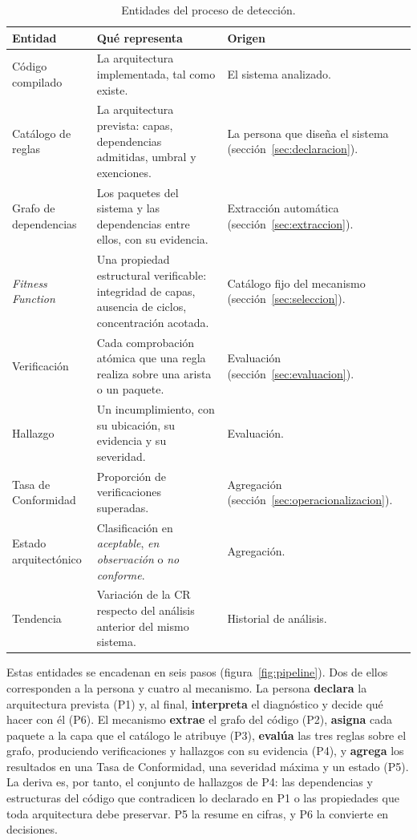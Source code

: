 \begin{table}[H]
\centering
\caption{Entidades del proceso de detección.}
\label{tab:entidades}
\footnotesize
\begin{tabularx}{\textwidth}{>{\raggedright\arraybackslash}p{3.0cm}X>{\raggedright\arraybackslash}p{3.2cm}}
\toprule
\textbf{Entidad} & \textbf{Qué representa} & \textbf{Origen} \\
\midrule
Código compilado & La arquitectura implementada, tal como existe. & El sistema analizado. \\
Catálogo de reglas & La arquitectura prevista: capas, dependencias admitidas, umbral y exenciones. & La persona que diseña el sistema (sección~\ref{sec:declaracion}). \\
Grafo de dependencias & Los paquetes del sistema y las dependencias entre ellos, con su evidencia. & Extracción automática (sección~\ref{sec:extraccion}). \\
\textit{Fitness Function} & Una propiedad estructural verificable: integridad de capas, ausencia de ciclos, concentración acotada. & Catálogo fijo del mecanismo (sección~\ref{sec:seleccion}). \\
Verificación & Cada comprobación atómica que una regla realiza sobre una arista o un paquete. & Evaluación (sección~\ref{sec:evaluacion}). \\
Hallazgo & Un incumplimiento, con su ubicación, su evidencia y su severidad. & Evaluación. \\
Tasa de Conformidad & Proporción de verificaciones superadas. & Agregación (sección~\ref{sec:operacionalizacion}). \\
Estado arquitectónico & Clasificación en \textit{aceptable}, \textit{en observación} o \textit{no conforme}. & Agregación. \\
Tendencia & Variación de la CR respecto del análisis anterior del mismo sistema. & Historial de análisis. \\
\bottomrule
\end{tabularx}
\end{table}

Estas entidades se encadenan en seis pasos (figura~\ref{fig:pipeline}). Dos de ellos corresponden a la persona y cuatro al mecanismo. La persona \textbf{declara} la arquitectura prevista (P1) y, al final, \textbf{interpreta} el diagnóstico y decide qué hacer con él (P6). El mecanismo \textbf{extrae} el grafo del código (P2), \textbf{asigna} cada paquete a la capa que el catálogo le atribuye (P3), \textbf{evalúa} las tres reglas sobre el grafo, produciendo verificaciones y hallazgos con su evidencia (P4), y \textbf{agrega} los resultados en una Tasa de Conformidad, una severidad máxima y un estado (P5). La deriva es, por tanto, el conjunto de hallazgos de P4: las dependencias y estructuras del código que contradicen lo declarado en P1 o las propiedades que toda arquitectura debe preservar. P5 la resume en cifras, y P6 la convierte en decisiones.

